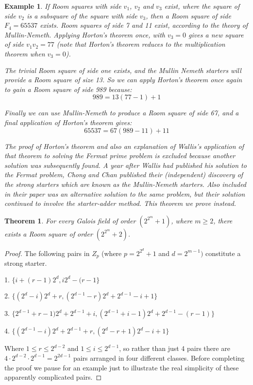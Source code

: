 \documentclass[
  11pt,
  a4paper]{book}
\newtheorem{theorem}{Theorem}
\newtheorem{example}{Example}
\begin{document}
\begin{example}
If Room squares with side $v_1$, $v_2$ and $v_3$ exist,
where the square of side $v_2$ is a subsquare of the square
with side $v_3$, then a Room square of side $F_4 = 65537$
exists. Room squares of side 7 and 11 exist, according to
the theory of Mullin-Nemeth. Applying Horton’s theorem
once, with $v_3 = 0$ gives a new square of side $v_1v_2 = 77$
(note that Horton’s theorem reduces to the multiplication
theorem when $v_3 = 0$).

The trivial Room square of side one exists, and the Mullin
Nemeth starters will provide a Room square of size 13. So we
can apply Horton’s theorem once again to gain a Room square
of side 989 because: $$989 = 13(77 - 1) + 1$$

Finally we can use Mullin-Nemeth to produce a Room square of
side 67, and a final application of Horton’s theorem gives:
$$65537 = 67(989 - 11) + 11$$

The proof of Horton’s theorem and also an explanation of
Wallis’s application of that theorem to solving the Fermat
prime problem is excluded because another solution was
subsequently found. A year after Wallis had published his
solution to the Fermat problem, Chong and Chan published
their (independent) discovery of the strong starters which
are known as the Mullin-Nemeth starters.  Also included in
their paper was an alternative solution to the same problem,
but their solution continued to involve the starter-adder
method. This theorem we prove instead.
\end{example}

\begin{theorem}
For every Galois field of order $(2^{2^m} + 1)$, where
$m \geq 2$, there exists a Room square of order
$(2^{2^m} + 2)$.
\end{theorem}

\begin{proof}
The following pairs in $Z_p$ (where $p = 2^{2^d} + 1$ and
$d = 2^{m - 1})$ constitute a strong starter.

  1.  $\{i + (r - 1)2^d, i2^d - (r - 1\}$

  2.  $\{(2^d - i)2^d + r, (2^{d - 1} - r)2^d + 2^{d - 1} - i + 1\}$

  3.  $\{2^{d-1} + r - 1)2^d + 2^{d - 1} + i, (2^{d - 1} + i - 1)2^d + 2^{d - 1} - (r - 1)\}$

  4.  $\{(2^{d-1}-i)2^d+2^{d-1}+r,(2^d-r+1)2^d-i+1\}$

Where $1 \leq r \leq 2^{d - 2}$ and $1 \leq i \leq 2^{d-1}$, so rather
than just 4 pairs there are
$4 \cdot 2^{d - 2} \cdot 2^{d - 1} = 2^{2d - 1}$
pairs arranged in four different classes. Before completing
the proof we pause for an example just to illustrate the
real simplicity of these apparently complicated pairs.
\end{proof}
\end{document}
